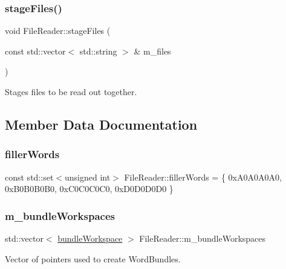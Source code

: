 \subsubsection{\texorpdfstring{stage\+Files()}{stageFiles()}}
{\footnotesize\ttfamily void File\+Reader\+::stage\+Files (\begin{DoxyParamCaption}\item[{const std\+::vector$<$ std\+::string $>$ \&}]{m\+\_\+files }\end{DoxyParamCaption})}



Stages files to be read out together. 



\subsection{Member Data Documentation}
\mbox{\label{class_file_reader_a7a0bb5e7cb117f6a415f005665893509}} 
\subsubsection{\texorpdfstring{filler\+Words}{fillerWords}}
{\footnotesize\ttfamily const std\+::set$<$unsigned int$>$ File\+Reader\+::filler\+Words = \{ 0x\+A0\+A0\+A0\+A0, 0x\+B0\+B0\+B0\+B0, 0x\+C0\+C0\+C0\+C0, 0x\+D0\+D0\+D0\+D0 \}\hspace{0.3cm}{\ttfamily [private]}}

\mbox{\label{class_file_reader_ab59c633bc2943dcea7c977585e7e48b3}} 
\subsubsection{\texorpdfstring{m\+\_\+bundle\+Workspaces}{m\_bundleWorkspaces}}
{\footnotesize\ttfamily std\+::vector$<$ \hyperlink{class_file_reader_a7fb625dc45cee3256d37cc19c65cad86}{bundle\+Workspace} $>$ File\+Reader\+::m\+\_\+bundle\+Workspaces\hspace{0.3cm}{\ttfamily [private]}}



Vector of pointers used to create Word\+Bundles. 

